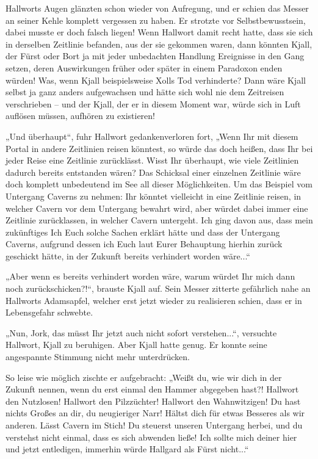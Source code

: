 \documentclass[10pt, a4paper, oneside]{book}
\begin{document}
Hallworts Augen glänzten schon wieder von Aufregung, und er schien das Messer an seiner Kehle komplett vergessen zu haben. Er strotzte vor Selbstbewusstsein, dabei musste er doch falsch liegen! Wenn Hallwort damit recht hatte, dass sie sich in derselben Zeitlinie befanden, aus der sie gekommen waren, dann könnten Kjall, der Fürst oder Bort ja mit jeder unbedachten Handlung Ereignisse in den Gang setzen, deren Auswirkungen früher oder später in einem Paradoxon enden würden! Was, wenn Kjall beispielsweise Xolls Tod verhinderte? Dann wäre Kjall selbst ja ganz anders aufgewachsen und hätte sich wohl nie dem Zeitreisen verschrieben – und der Kjall, der er in diesem Moment war, würde sich in Luft auflösen müssen, aufhören zu existieren!

„Und überhaupt“, fuhr Hallwort gedankenverloren fort, „Wenn Ihr mit diesem Portal in andere Zeitlinien reisen könntest, so würde das doch heißen, dass Ihr bei jeder Reise eine Zeitlinie zurücklässt. Wisst Ihr überhaupt, wie viele Zeitlinien dadurch bereits entstanden wären? Das Schicksal einer einzelnen Zeitlinie wäre doch komplett unbedeutend im See all dieser Möglichkeiten. Um das Beispiel vom Untergang Caverns zu nehmen: Ihr könntet vielleicht in eine Zeitlinie reisen, in welcher Cavern vor dem Untergang bewahrt wird, aber würdet dabei immer eine Zeitlinie zurücklassen, in welcher Cavern untergeht. Ich ging davon aus, dass mein zukünftiges Ich Euch solche Sachen erklärt hätte und dass der Untergang Caverns, aufgrund dessen ich Euch laut Eurer Behauptung hierhin zurück geschickt hätte, in der Zukunft bereits verhindert worden wäre...“

„Aber wenn es bereits verhindert worden wäre, warum würdet Ihr mich dann noch zurückschicken?!“, brauste Kjall auf. Sein Messer zitterte gefährlich nahe an Hallworts Adamsapfel, welcher erst jetzt wieder zu realisieren schien, dass er in Lebensgefahr schwebte.

„Nun, Jork, das müsst Ihr jetzt auch nicht sofort verstehen...“, versuchte Hallwort, Kjall zu beruhigen. Aber Kjall hatte genug. Er konnte seine angespannte Stimmung nicht mehr unterdrücken.

So leise wie möglich zischte er aufgebracht: „Weißt du, wie wir dich in der Zukunft nennen, wenn du erst einmal den Hammer abgegeben hast?! Hallwort den Nutzlosen! Hallwort den Pilzzüchter! Hallwort den Wahnwitzigen! Du hast nichts Großes an dir, du neugieriger Narr! Hältst dich für etwas Besseres als wir anderen. Lässt Cavern im Stich! Du steuerst unseren Untergang herbei, und du verstehst nicht einmal, dass es sich abwenden ließe! Ich sollte mich deiner hier und jetzt entledigen, immerhin würde Hallgard als Fürst nicht...“
\end{document}
